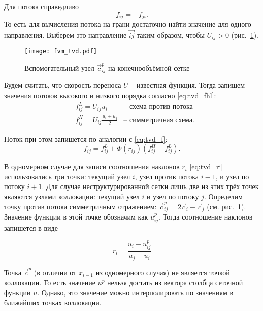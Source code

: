 Для потока справедливо
\begin{equation}
\label{eq:tvd_fij_fji}
f_{ij} = -f_{ji}.
\end{equation}
То есть для вычисления потока на грани достаточно найти значение для одного направления.
Выберем это направление $\overrightarrow{ij}$ таким образом, чтобы $U_{ij} > 0$ (рис.~\ref{fig:fvm_tvd}).


\begin{figure}[h!]
\centering
\texttt{[image: fvm\_tvd.pdf]}
\caption{Вспомогательный узел $\vec c^p_{ij}$ на конечнообъёмной сетке}
\label{fig:fvm_tvd}
\end{figure}

Будем считать, что скорость переноса $U$ -- известная функция.
Тогда запишем значения потоков высокого и низкого порядка согласно \cref{eq:tvd_fhl}:
\begin{equation}
\label{eq:tvd_fhl_fvm}
\begin{aligned}
&f^L_{ij} = U_{ij} u_i                 &\text{-- схема против потока}\\
&f^H_{ij} = U_{ij} \frac{u_i + u_j}{2} &\text{-- симметричная схема}.
\end{aligned}
\end{equation}

Поток при этом запишется по аналогии с \cref{eq:tvd_f}:
\begin{equation}
\label{eq:tvd_f_fvm}
f_{ij} = f^L_{ij} + \Phi(r_{ij}) \left( f^H_{ij} - f^L_{ij} \right).
\end{equation}

В одномерном случае для записи соотношения наклонов $r_i$ \cref{eq:tvd_ri} использовались
три точки: текущий узел $i$, узел против потока $i-1$, и узел по потоку $i+1$.
Для случае неструктурированной сетки лишь две из этих трёх точек являются
узлами коллокации: текущий узел $i$ и узел по потоку $j$. Определим точку
против потока симметричным отражением: $\vec{c}^p_{ij} = 2\vec c_i - \vec c_j$ (см. рис.~\ref{fig:fvm_tvd}).
Значение функции в этой точке обозначим как $u^p_{ij}$.
Тогда соотношение наклонов запишется в виде

\begin{equation}
\label{eq:tvd_ri_fvm}
r_i = \frac{u_i - u_{ij}^p}{u_j - u_i}
\end{equation}

Точка $\vec c^p$ (в отличии от $x_{i-1}$ из одномерного случая)
не является точкой коллокации. То есть
значение $u^p$ нельзя достать из вектора столбца сеточной функции $u$.
Однако, это значение можно интерполировать
по значениям в ближайших точках коллокации.

